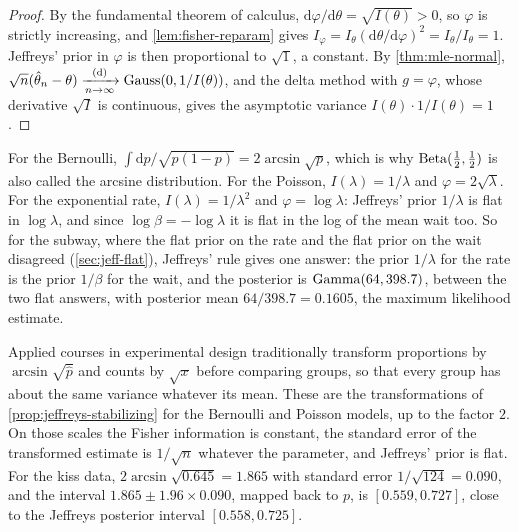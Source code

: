 
\begin{proof}
By the fundamental theorem of calculus, $\mathrm{d}\varphi/\mathrm{d}\theta = \sqrt{I(\theta)} > 0$, so $\varphi$ is strictly increasing, and \cref{lem:fisher-reparam} gives $I_\varphi = I_\theta(\mathrm{d}\theta/\mathrm{d}\varphi)^2 = I_\theta/I_\theta = 1$. Jeffreys' prior in $\varphi$ is then proportional to $\sqrt{1}$, a constant. By \cref{thm:mle-normal}, $\sqrt{n}(\hat{\theta}_n - \theta) \xrightarrow [n \to \infty ]{\text{(d)}} \text{Gauss}(0, 1/I(\theta))$, and the delta method with $g = \varphi$, whose derivative $\sqrt{I}$ is continuous, gives the asymptotic variance $I(\theta) \cdot 1/I(\theta) = 1$.
\end{proof}

For the Bernoulli, $\int \mathrm{d}p/\sqrt{p(1-p)} = 2\arcsin\sqrt{p}$, which is why $\mathrm{Beta}(\frac12, \frac12)$ is also called the arcsine distribution.
For the Poisson, $I(\lambda) = 1/\lambda$ and $\varphi = 2\sqrt{\lambda}$.
For the exponential rate, $I(\lambda) = 1/\lambda^2$ and $\varphi = \log\lambda$: Jeffreys' prior $1/\lambda$ is flat in $\log\lambda$, and since $\log\beta = -\log\lambda$ it is flat in the log of the mean wait too.
So for the subway, where the flat prior on the rate and the flat prior on the wait disagreed (\cref{sec:jeff-flat}), Jeffreys' rule gives one answer: the prior $1/\lambda$ for the rate is the prior $1/\beta$ for the wait, and the posterior is $\mathrm{Gamma}(64, 398.7)$, between the two flat answers, with posterior mean $64/398.7 = 0.1605$, the maximum likelihood estimate.

\begin{bridge}
Applied courses in experimental design traditionally transform proportions by $\arcsin\sqrt{\hat{p}}$ and counts by $\sqrt{x}$ before comparing groups, so that every group has about the same variance whatever its mean.
These are the transformations of \cref{prop:jeffreys-stabilizing} for the Bernoulli and Poisson models, up to the factor $2$.
On those scales the Fisher information is constant, the standard error of the transformed estimate is $1/\sqrt{n}$ whatever the parameter, and Jeffreys' prior is flat.
For the kiss data, $2\arcsin\sqrt{0.645} = 1.865$ with standard error $1/\sqrt{124} = 0.090$, and the interval $1.865 \pm 1.96 \times 0.090$, mapped back to $p$, is $[0.559, 0.727]$, close to the Jeffreys posterior interval $[0.558, 0.725]$.
\end{bridge}

